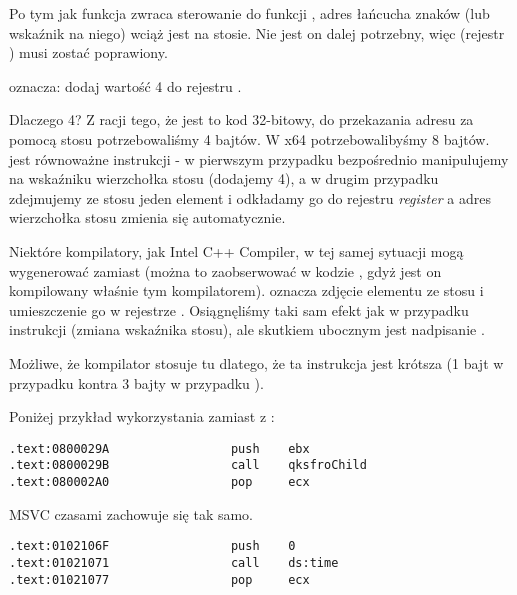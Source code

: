Po tym jak funkcja \printf zwraca sterowanie do funkcji \main, adres łańcucha znaków (lub wskaźnik na niego) wciąż jest na stosie.
Nie jest on dalej potrzebny, więc  (rejestr \ESP) musi zostać poprawiony.

 oznacza: dodaj wartość 4 do rejestru \ESP.

Dlaczego 4? Z racji tego, że jest to kod 32-bitowy, do przekazania adresu za pomocą stosu potrzebowaliśmy 4 bajtów. W x64 potrzebowalibyśmy 8 bajtów.\\
 jest równoważne instrukcji  - w pierwszym przypadku bezpośrednio manipulujemy na wskaźniku wierzchołka stosu (dodajemy 4), a w drugim przypadku zdejmujemy ze stosu jeden element i odkładamy go do rejestru \emph{register} a adres wierzchołka stosu zmienia się automatycznie.

\myindex{\oracle}

Niektóre kompilatory, jak Intel C++ Compiler, w tej samej sytuacji mogą wygenerować  zamiast \ADD (można to zaobserwować w kodzie \oracle{}, gdyż jest on kompilowany właśnie tym kompilatorem).
 oznacza zdjęcie elementu ze stosu i umieszczenie go w rejestrze \ECX.
Osiągnęliśmy taki sam efekt jak w przypadku instrukcji \ADD (zmiana wskaźnika stosu), ale skutkiem ubocznym jest nadpisanie \ECX.

Możliwe, że kompilator stosuje tu  dlatego, że ta instrukcja jest krótsza (1 bajt w przypadku  kontra 3 bajty w przypadku ).

Poniżej przykład wykorzystania \POP zamiast \ADD z \oracle{}:

\begin{lstlisting}[caption=\oracle 10.2 Linux (plik app.o),style=customasmx86]
.text:0800029A                 push    ebx
.text:0800029B                 call    qksfroChild
.text:080002A0                 pop     ecx
\end{lstlisting}

MSVC czasami zachowuje się tak samo.

\begin{lstlisting}[caption=MineSweeper from Windows 7 32-bit]
.text:0102106F                 push    0
.text:01021071                 call    ds:time
.text:01021077                 pop     ecx
\end{lstlisting}

